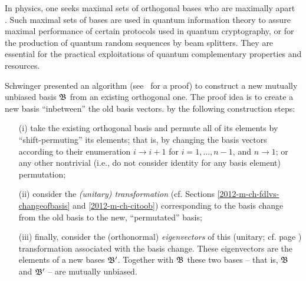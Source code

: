 {\color{Purple}
In physics, one seeks maximal sets of orthogonal bases who
are maximally apart~\cite{WooFie,durt} .
Such maximal sets of bases are used in quantum information theory
to assure maximal performance of certain protocols
used in quantum cryptography, or for the production of
quantum random sequences by beam splitters.
They are essential for the practical exploitations of quantum complementary properties
and resources.
}



Schwinger presented an algorithm (see~\cite{Schwinger.60} for a proof)
to construct a new mutually unbiased basis ${\frak B}$   from an existing orthogonal one.
The proof idea
is to create a new basis ``inbetween'' the old basis vectors.
by the following construction steps:
\begin{itemize}
\item[(i)]
take the existing orthogonal basis and permute all of its elements by ``shift-permuting'' its elements; that is, by
changing
the basis vectors according to their enumeration $i \rightarrow i+1$ for $i=1,\ldots , n-1$, and $n \rightarrow 1$;
or any other nontrivial (i.e., do not consider identity for any basis element) permutation;
\item[(ii)]
consider the {\em (unitary) transformation} (cf. Sections \ref{2012-m-ch-fdlvs-changeofbasis} and \ref{2012-m-ch-citoob})
corresponding to the basis change from the old basis to the new, ``permutated'' basis;
\item[(iii)]
finally, consider the (orthonormal) {\em eigenvectors} 
of this (unitary; cf. page
\pageref{2014-m-ch-fdvs-unitary}) transformation associated with the basis change.
These eigenvectors are the elements of a new bases  ${\frak B}'$.
Together with ${\frak B}$ these two bases
-- that is, ${\frak B}$ and ${\frak B}'$ --  are mutually unbiased.
\end{itemize}

